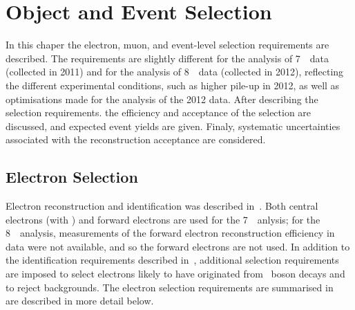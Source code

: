 \graphicspath{{Chapters/ObjEventSelection/Figures/}}
\chapter{Object and Event Selection}
\label{chap:ObjEventSelection}

In this chaper the electron, muon, and event-level selection requirements are described. 
The requirements are
slightly different for the analysis of 7~\tev\ data (collected in 2011) and for
the analysis of 8~\tev\ data (collected in 2012),
reflecting the different experimental conditions, such as higher pile-up in
2012, as well as optimisations made for the analysis of the 2012 data. After
describing the selection requirements. the efficiency and acceptance of the
selection are discussed, and expected event yields are given. Finaly, systematic
uncertainties associated with the reconstruction acceptance are considered.

\section{Electron Selection}
\label{sec:objsel-el}

Electron reconstruction and identification was described in~. Both
central electrons 
(with ) 
and forward electrons are used for the 7~\tev\ anlysis; for the 8~\tev\
analysis,
measurements of the forward electron reconstruction efficiency in data were
not available, and so the forward electrons are not used. In
addition to the identification requirements described in~,
additional selection requirements are imposed to select electrons likely to have
originated from \Z\ boson decays and to reject backgrounds. 
The electron selection requirements
are summarised in~ are described in more detail below. 

